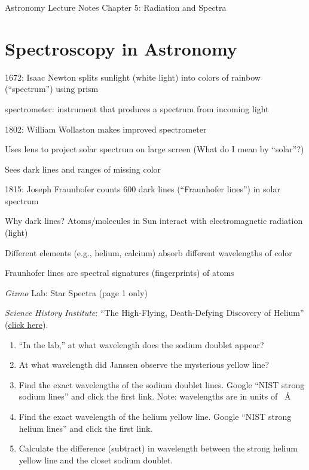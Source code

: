 \documentclass{article}
\begin{document}
Astronomy \hfill Lecture Notes \hfill Chapter 5: Radiation and Spectra

\section*{Spectroscopy in Astronomy}

1672: Isaac Newton splits sunlight (white light) into colors of rainbow (``spectrum'') using prism


spectrometer: instrument that produces a spectrum from incoming light

1802: William Wollaston makes improved spectrometer

Uses lens to project solar spectrum on large screen {\color{lightgray} (What do I mean by ``solar''?)}

Sees dark lines and ranges of missing color 

1815: Joseph Fraunhofer counts 600 dark lines (``Fraunhofer lines'') in solar spectrum

Why dark lines? Atoms/molecules in Sun interact with electromagnetic radiation (light)

Different elements (e.g., helium, calcium) absorb different wavelengths of color

Fraunhofer lines are spectral signatures (fingerprints) of atoms



 \textit{Gizmo} Lab: Star Spectra (page 1 only)


 \textit{Science History Institute}: ``The High-Flying, Death-Defying Discovery of Helium'' (\href{https://www.sciencehistory.org/distillations/the-high-flying-death-defying-discovery-of-helium}{click here}).

\begin{enumerate}
\setlength\itemsep{0.1ex}
    \item ``In the lab,'' at what wavelength does the sodium doublet appear?
    \item At what wavelength did Janssen observe the mysterious yellow line?
    \item Find the exact wavelengths of the sodium doublet lines. Google ``NIST strong sodium lines'' and click the first link. Note: wavelengths are in units of \SI{}{\angstrom}
    \item Find the exact wavelength of the helium yellow line. Google ``NIST strong helium lines'' and click the first link.
    \item Calculate the difference (subtract) in wavelength between the strong helium yellow line and the closet sodium doublet. 
\end{enumerate}








\clearpage

\printnoidxglossaries
\end{document}
